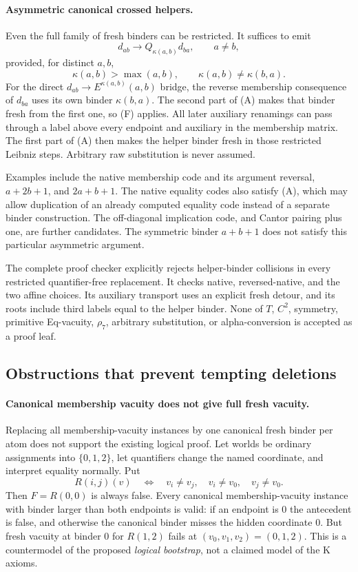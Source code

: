 \paragraph{Asymmetric canonical crossed helpers.}
Even the full family of fresh binders can be restricted.  It suffices
to emit
\[
 d_{ab}\longrightarrow Q_{\kappa(a,b)}d_{ba},\qquad a\ne b,
\]
provided, for distinct $a,b$,
\[
 \kappa(a,b)>\max(a,b),\qquad
 \kappa(a,b)\ne\kappa(b,a).                                   \tag{A}
\]
For the direct $d_{ab}\to E^{\kappa(a,b)}(a,b)$ bridge, the reverse
membership consequence of $d_{ba}$ uses its own binder $\kappa(b,a)$.
The second part of (A) makes that binder fresh from the first one, so
(F) applies.  All later auxiliary renamings can pass through a label
above every endpoint and auxiliary in the membership matrix.  The first
part of (A) then makes the helper binder fresh in those restricted
Leibniz steps.  Arbitrary raw substitution is never assumed.

Examples include the native membership code and its argument reversal,
$a+2b+1$, and $2a+b+1$.  The native equality codes also satisfy (A),
which may allow duplication of an already computed equality code instead
of a separate binder construction.  The off-diagonal implication code,
and Cantor pairing plus one, are further candidates.  The symmetric
binder $a+b+1$ does not satisfy this particular asymmetric argument.

The complete proof checker
 explicitly rejects
helper-binder collisions in every restricted quantifier-free replacement.
It checks native, reversed-native, and the two affine choices.  Its
auxiliary transport uses an explicit fresh detour, and its roots include
third labels equal to the helper binder.  None of $T$, $C^2$, symmetry,
primitive Eq-vacuity, $\rho_7$, arbitrary substitution, or alpha-conversion
is accepted as a proof leaf.

\subsection{Obstructions that prevent tempting deletions}

\paragraph{Canonical membership vacuity does not give full fresh vacuity.}
Replacing all membership-vacuity instances by one canonical fresh binder
per atom does not support the existing logical proof.  Let worlds be
ordinary assignments into $\{0,1,2\}$, let quantifiers change the named
coordinate, and interpret equality normally.  Put
\[
 R(i,j)(v)\quad\Longleftrightarrow\quad
 v_i\ne v_j,\quad v_i\ne v_0,\quad v_j\ne v_0.
\]
Then $F=R(0,0)$ is always false.  Every canonical membership-vacuity
instance with binder larger than both endpoints is valid: if an endpoint
is 0 the antecedent is false, and otherwise the canonical binder misses
the hidden coordinate 0.  But fresh vacuity at binder 0 for $R(1,2)$
fails at $(v_0,v_1,v_2)=(0,1,2)$.  This is a countermodel of the proposed
\emph{logical bootstrap}, not a claimed model of the K axioms.

